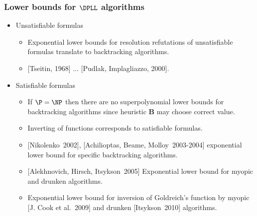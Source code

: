 \begin{frame}
    \frametitle{Lower bounds for $\DPLL$ algorithms}

    \pause
	\begin{itemize}
		\item Unsatisfiable formulas
		\begin{itemize}
            \item{} Exponential lower bounds for resolution refutations
				of unsatisfiable formulas translate to backtracking
                algorithms.
			\item{} [Tseitin, 1968] ... [Pudlak, Implagliazzo, 2000].
		\end{itemize}
        \pause
		\item Satisfiable formulas
		\begin{itemize}
			\item If $\P = \NP$ then there are no superpolynomial
		        lower bounds for backtracking algorithms since
                heuristic $\mathbf{B}$ may choose correct value.
            \pause
			\item Inverting of functions corresponds to satisfiable
		        formulas.
            \pause
            \item{} [Nikolenko~2002], [Achilioptas, Beame, Molloy~2003-2004]
				exponential lower bound for specific backtracking
                algorithms.
            \item{} [Alekhnovich, Hirsch, Itsykson~2005] Exponential lower bound 
				for myopic and drunken algorithms.
            \pause
            \item{}  Exponential lower bound 
		for inversion of Goldreich's function by myopic [J. Cook et al.~2009] 
		and drunken [Itsykson~2010] algorithms.
		\end{itemize}
	\end{itemize}
\end{frame}

